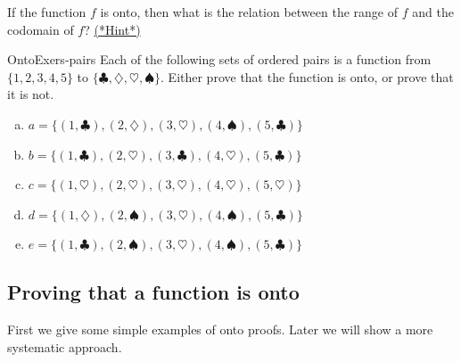 \begin{exercise}{45}
If the function $f$ is onto, then what is the relation between the range of $f$ and the codomain of $f$?
\hyperref[sec:functions:hints]{(*Hint*)}
\end{exercise}

\begin{exercise}{OntoExers-pairs}
Each of the following sets of ordered pairs is a function from $\{1,2,3,4,5\}$ to $\{\clubsuit,\diamondsuit,\heartsuit,\spadesuit\}$. Either prove that the function is onto, or prove that it is not.
\begin{enumerate}[(a)]
\item \label{OntoExers-pairs-a}
$a = \{ (1,\clubsuit), (2,\diamondsuit), (3,\heartsuit), (4,\spadesuit), (5,\clubsuit) \}$
\item \label{OntoExers-pairs-b}
$b = \{ (1,\clubsuit), (2,\heartsuit), (3,\clubsuit), (4,\heartsuit), (5,\clubsuit) \}$
\item \label{OntoExers-pairs-c}
$c = \{ (1,\heartsuit), (2,\heartsuit), (3, \heartsuit), (4,\heartsuit), (5, \heartsuit) \}$
\item \label{OntoExers-pairs-d}
$d = \{ (1,\diamondsuit), (2,\spadesuit), (3, \heartsuit), (4,\spadesuit), (5, \clubsuit) \}$
\item \label{OntoExers-pairs-e}
$e = \{ (1,\clubsuit), (2,\spadesuit), (3, \heartsuit), (4,\spadesuit), (5, \clubsuit) \}$
\end{enumerate}
\end{exercise}

\subsection{Proving that a function is onto}

First we give some simple examples of onto proofs. Later we will show a more systematic approach.

